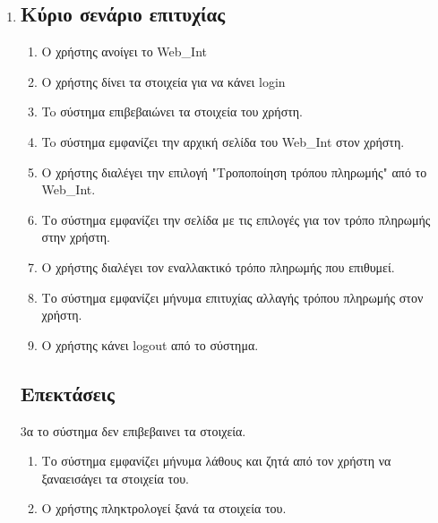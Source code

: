 \documentclass[12pt]{article}
\begin{document}
\begin{enumerate}
\item
\subsection*{Κύριο σενάριο επιτυχίας}
\begin{enumerate}[label=\arabic*.]
\item
Ο χρήστης ανοίγει το \textlatin{Web\_Int}
\item
Ο χρήστης δίνει τα στοιχεία για να κάνει \textlatin{login}
\item
To σύστημα επιβεβαιώνει τα στοιχεία του χρήστη.
\item
To σύστημα εμφανίζει την αρχική σελίδα του \textlatin{Web\_Int} στον χρήστη.
\item
Ο χρήστης διαλέγει την επιλογή "Τροποποίηση τρόπου πληρωμής" 
από το \textlatin{Web\_Int}.
\item
Το σύστημα εμφανίζει την σελίδα με τις επιλογές για τον τρόπο 
πληρωμής στην χρήστη.
\item
Ο χρήστης διαλέγει τον εναλλακτικό τρόπο πληρωμής που επιθυμεί.
\item
Το σύστημα εμφανίζει μήνυμα επιτυχίας αλλαγής τρόπου πληρωμής 
στον χρήστη.
\item
Ο χρήστης κάνει \textlatin{logout} από το σύστημα.
\end{enumerate}

\subsection*{Επεκτάσεις}
3α το σύστημα δεν επιβεβαινει τα στοιχεία.
\begin{enumerate}[label=\arabic*.]
\item
Το σύστημα εμφανίζει μήνυμα λάθους και ζητά από τον 
χρήστη να ξαναεισάγει τα στοιχεία του.
\item 
Ο χρήστης πληκτρολογεί ξανά τα στοιχεία του.
\end{enumerate}


\end{enumerate}
\end{document}

